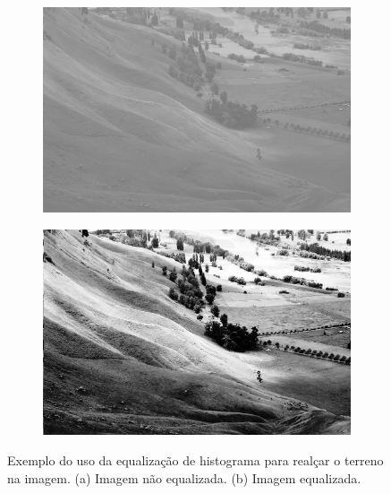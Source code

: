 \begin{figure}[H]
    \centering
    \begin{subfigure}[t]{0.3\textwidth}
      \includegraphics[width=\textwidth]{figuras/Unequalized.jpg}
      \label{fig:unequalizedImage}
    \end{subfigure}
    \begin{subfigure}[t]{0.3\textwidth}
      \includegraphics[width=\textwidth]{figuras/Equalized.jpg}
      \label{fig:equalizedImage}
    \end{subfigure}
    \caption{Exemplo do uso da equalização de histograma para realçar o terreno
            na imagem. (a) Imagem não equalizada. (b) Imagem equalizada.}
    \label{fig:equalization}
\end{figure}

